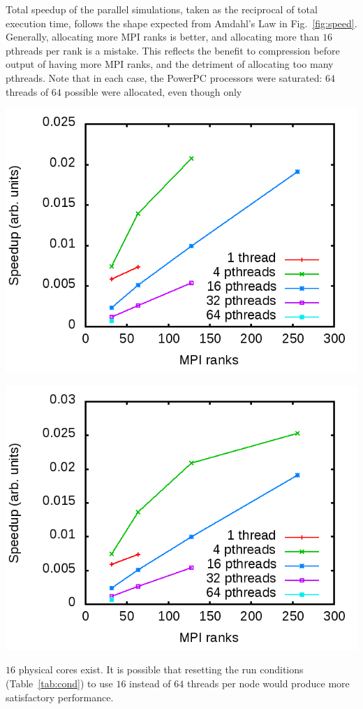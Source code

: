 \documentclass[11pt]{article}
\begin{document}
\begin{multicols*}{2}
Total speedup of the parallel simulations, taken as the reciprocal of total execution time, follows the shape expected from Amdahl's Law in Fig.~\ref{fig:speed}.
Generally, allocating more MPI ranks is better, and allocating more than $16$ pthreads per rank is a mistake.
This reflects the benefit to compression before output of having more MPI ranks, and the detriment of allocating too many pthreads.
Note that in each case, the PowerPC processors were saturated: $64$ threads of $64$ possible were allocated, even though only 
\begin{center}
\begin{minipage}{0.4\textwidth}\centering
  \includegraphics[width=\textwidth]{img/prMC-speed}

  \includegraphics[width=\textwidth]{img/pr-speed}
\end{minipage}
\end{center}
$16$ physical cores exist.
It is possible that resetting the run conditions (Table~\ref{tab:cond}) to use $16$ instead of $64$ threads per node would produce more satisfactory performance.



\end{multicols*}
\end{document}
